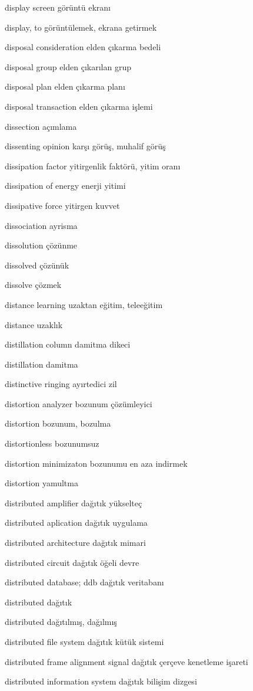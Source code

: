 \documentclass[12pt,fleqn]{article}\usepackage{../../common}
\begin{document}
display screen görüntü ekranı

display, to görüntülemek, ekrana getirmek

disposal consideration elden çıkarma bedeli

disposal group elden çıkarılan grup

disposal plan elden çıkarma planı

disposal transaction elden çıkarma işlemi

dissection açımlama

dissenting opinion karşı görüş, muhalif görüş

dissipation factor yitirgenlik faktörü, yitim oranı

dissipation of energy enerji yitimi

dissipative force yitirgen kuvvet

dissociation ayrisma

dissolution çözünme

dissolved çözünük

dissolve çözmek

distance learning uzaktan eğitim, teleeğitim

distance uzaklık

distillation column damitma dikeci

distillation damitma

distinctive ringing ayırtedici zil

distortion analyzer bozunum çözümleyici

distortion bozunum, bozulma

distortionless bozunumsuz

distortion minimizaton bozunumu en aza indirmek

distortion yamultma

distributed amplifier dağıtık yükselteç

distributed aplication dağıtık uygulama

distributed architecture dağıtık mimari

distributed circuit dağıtık öğeli devre

distributed database; ddb dağıtık veritabanı

distributed dağıtık

distributed dağıtılmış, dağılmış

distributed file system dağıtık kütük sistemi

distributed frame alignment signal dağıtık çerçeve kenetleme işareti

distributed information system dağıtık bilişim dizgesi
\end{document}

